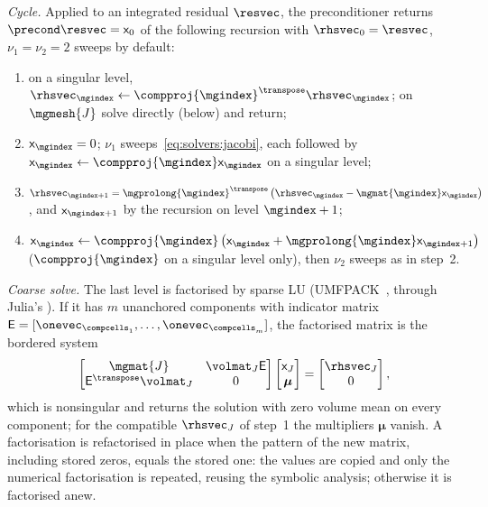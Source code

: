 \emph{Cycle.} Applied to an integrated residual $\resvec$, the preconditioner
returns $\precond\resvec=\mathsf{x}_0$ of the following recursion with
$\rhsvec_0=\resvec$, $\nu_1=\nu_2=2$ sweeps by default:
\begin{enumerate}
  \item on a singular level, $\rhsvec_{\mgindex}\leftarrow\compproj{\mgindex}^{\transpose}\rhsvec_{\mgindex}$;
    on $\mgmesh{J}$ solve directly (below) and return;
  \item $\mathsf{x}_{\mgindex}=0$; $\nu_1$ sweeps~\cref{eq:solvers:jacobi}, each
    followed by $\mathsf{x}_{\mgindex}\leftarrow\compproj{\mgindex}\mathsf{x}_{\mgindex}$
    on a singular level;
  \item $\rhsvec_{\mgindex+1}={\mgprolong{\mgindex}}^{\transpose}\roundpar{\rhsvec_{\mgindex}-\mgmat{\mgindex}\mathsf{x}_{\mgindex}}$,
    and $\mathsf{x}_{\mgindex+1}$ by the recursion on level $\mgindex+1$;
  \item $\mathsf{x}_{\mgindex}\leftarrow\compproj{\mgindex}\roundpar{\mathsf{x}_{\mgindex}+\mgprolong{\mgindex}\mathsf{x}_{\mgindex+1}}$
    ($\compproj{\mgindex}$ on a singular level only), then $\nu_2$ sweeps as in step~2.
\end{enumerate}
\emph{Coarse solve.} The last level is factorised by sparse LU
(UMFPACK~\cite{davis2004}, through Julia's ). If it has $m$
unanchored components with indicator matrix
$\mathsf{E}=[\onevec_{\compcells_1},\dots,\onevec_{\compcells_m}]$, the
factorised matrix is the bordered system
\begin{equation}\label{eq:solvers:augmented}
  \begin{bmatrix}
    \mgmat{J} & \volmat_J\mathsf{E}\\
    \mathsf{E}^{\transpose}\volmat_J & 0
  \end{bmatrix}
  \begin{bmatrix}\mathsf{x}_J\\ \boldsymbol{\mu}\end{bmatrix}
  =\begin{bmatrix}\rhsvec_J\\ 0\end{bmatrix},
\end{equation}
which is nonsingular and returns the solution with zero volume mean on every
component; for the compatible $\rhsvec_J$ of step~1 the multipliers
$\boldsymbol{\mu}$ vanish. A factorisation is refactorised in place when the
pattern of the new matrix, including stored zeros, equals the stored one: the
values are copied and only the numerical factorisation is repeated, reusing
the symbolic analysis; otherwise it is factorised anew.

